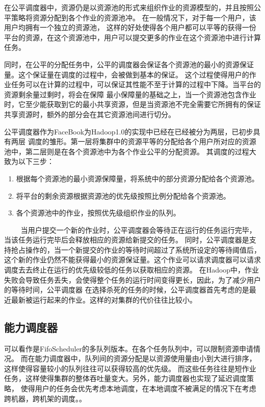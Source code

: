 在公平调度器中，资源仍是以资源池的形式来组织作业的资源模型的，并且按照公平策略将资源分配到各个作业的资源池冲。
在一般情况下，对于每一个用户，该用户均拥有一个独立的资源池，
这样的好处使得各个用户都可以平等的获得一份平台的资源，在这个资源池中，用户可以提交更多的作业在这个资源池中进行计算
任务。

同时，在公平的分配任务中，公平的调度器会保证各个资源池的最小的资源保证量。这个保证量在调度的过程中，会被做到基本的保证。
这个过程使得用户的作业任务可以在计算的过程中，可以保证其性能不至于计算的过程中下降。当平台的资源剩余量过剩时，将会在保障
最小保障量的基础之上，当一个资源池包含作业时，它至少能获取到它的最小共享资源，但是当资源池不完全需要它所拥有的保证共享资源时，额外的部分会在其它资源池间进行切分。

公平调度器作为FaceBook为Hadoop1.0的实现中已经在已经被分为两层，已初步具有两层
调度的雏形。第一层将集群中的资源平等的分配给各个用户所对应的资源池中，第二层则是在各个资源池中为各个作业公平的分配资源。
其调度的过程大致为以下三步：
\begin{enumerate}
\item 根据每个资源池的最小资源保障量，将系统中的部分资源分配给各个资源池。
\item 将平台的剩余资源根据资源池的优先级按照比例分配给各个资源池。
\item 各个资源池中的作业，按照优先级组织作业的队列。
\end{enumerate}
　　
当用户提交一个新的作业时，公平调度器会等待正在运行的任务运行完毕，当该任务运行完毕后会释放相应的资源给新提交的任务。
同时，公平调度器是支持抢占操作的，当一个新提交的作业的等待时间超过了系统所设定的等待阈值后，
这个新的作业仍然不能获得最小的资源保证量。这个作业可以请求调度器可以请求调度去去终止在运行的优先级较低的任务以获取相应的资源。
在Hadoop中，作业失败会导致任务丢失，会使得整个任务的运行时间变得更长，因此，为了减少用户的等待时间，公平调度器
在选择杀死的任务的时候，公平调度器首先考虑的是最近最新被运行起来的作业。这样的对集群的代价往往比较小。
\subsection{能力调度器}
可以看作是FifoScheduler的多队列版本。在各个任务队列中，可以限制资源申请情况。
而在能力调度器中，队列间的资源分配是以资源使用量由小到大进行排序，这样使得容量较小的队列往往可以获得较高的优先级。
而这些任务往往是短作业任务，这样使得集群的整体吞吐量变大。另外，能力调度器也实现了延迟调度策略，
使得用户的任务会优先考虑本地调度，在本地调度不被满足的情况下在考虑跨机器，跨机架的调度。。

